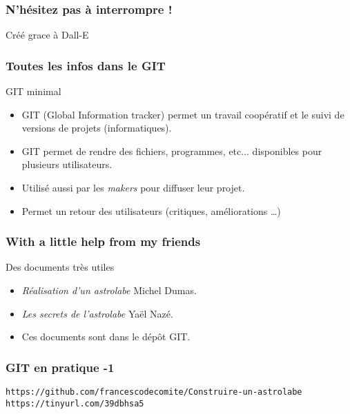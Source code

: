 \documentclass{beamer}
\begin{document}
\begin{frame}\frametitle{N'hésitez pas à interrompre !}
\begin{center}
\end{center}
{\hfill \small Créé grace à Dall-E}
   \end{frame}


      
   

\begin{frame}\frametitle{Toutes les infos dans le GIT}
\begin{block}{GIT minimal}
\begin{itemize}
\item GIT (Global Information tracker) permet un travail coopératif et le suivi de
versions de projets (informatiques). 
\item GIT permet de rendre des fichiers, programmes, etc... disponibles pour plusieurs utilisateurs.
\item Utilisé aussi par les {\it makers} pour diffuser leur projet. 
\item Permet un retour des utilisateurs (critiques, améliorations \dots)
\end{itemize}
\end{block}
   \end{frame}
   
   \begin{frame}\frametitle{With a little help from my friends}
\begin{block}{Des documents très utiles}
\begin{itemize}
\item {\em Réalisation d'un astrolabe} Michel Dumas. 
\item {\em Les secrets de l'astrolabe} Ya{\"e}l Nazé.
\item Ces documents sont dans le dépôt GIT. 
\end{itemize}
\end{block}

   \end{frame}

\begin{frame}\frametitle{GIT en pratique -1}
{\small \tt https://github.com/francescodecomite/Construire-un-astrolabe}
{\tt https://tinyurl.com/39dbhsa5}
\begin{center}
\end{center}
\vfill
\ 

\end{frame}
\end{document}
